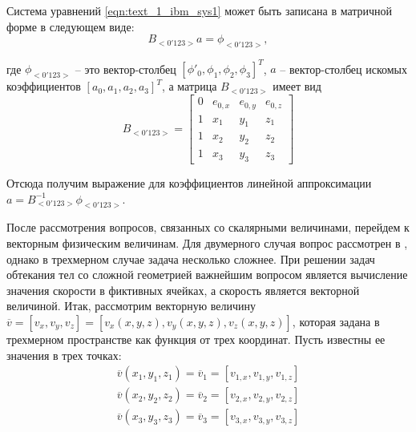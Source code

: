 Система уравнений \eqref{eqn:text_1_ibm_sys1} может быть записана в матричной форме в следующем виде:
\begin{equation}
	B_{<0'123>}a = \phi_{<0'123>},
\end{equation}

где $\phi_{<0'123>}$ -- это вектор-столбец $[\phi'_0, \phi_1, \phi_2, \phi_3]^T$, $a$ -- вектор-столбец искомых коэффициентов $[a_0, a_1, a_2, a_3]^T$, а матрица $B_{<0'123>}$ имеет вид
\begin{equation}\label{eqn:text_1_ibm_B1}
	B_{<0'123>} =
	\begin{bmatrix}
		0 & e_{0,x} & e_{0,y} & e_{0,z} \\
		1 & x_1 & y_1 & z_1 \\
		1 & x_2 & y_2 & z_2 \\
		1 & x_3 & y_3 & z_3
	\end{bmatrix}
\end{equation}

Отсюда получим выражение для коэффициентов линейной аппроксимации $a = B_{<0'123>}^{-1}\phi_{<0'123>}$.

После рассмотрения вопросов, связанных со скалярными величинами, перейдем к векторным физическим величинам.
Для двумерного случая вопрос рассмотрен в \cite{Vinnikov2007Immersed}, однако в трехмерном случае задача несколько сложнее.
При решении задач обтекания тел со сложной геометрией важнейшим вопросом является вычисление значения скорости в фиктивных ячейках, а скорость является векторной величиной.
Итак, рассмотрим векторную величину $\overline{v} = [v_x, v_y, v_z] = [v_x(x, y, z), v_y(x, y, z), v_z(x, y, z)]$, которая задана в трехмерном пространстве как функция от трех координат.
Пусть известны ее значения в трех точках:
\begin{equation}
	\begin{aligned}
		\overline{v}(x_1, y_1, z_1) = \overline{v}_1 = [v_{1,x}, v_{1,y}, v_{1,z}] \\
		\overline{v}(x_2, y_2, z_2) = \overline{v}_2 = [v_{2,x}, v_{2,y}, v_{2,z}] \\
		\overline{v}(x_3, y_3, z_3) = \overline{v}_3 = [v_{3,x}, v_{3,y}, v_{3,z}]
	\end{aligned}
\end{equation}

